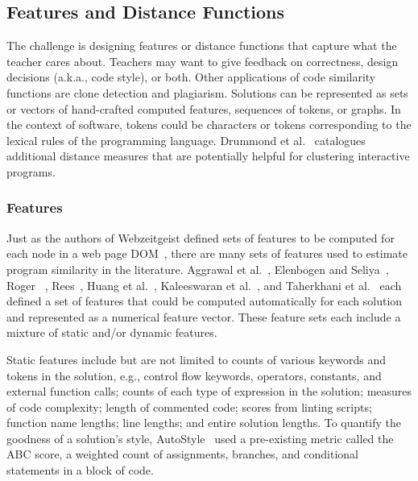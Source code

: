 
\subsection{Features and Distance Functions}

The challenge is designing features or distance functions that capture what the teacher cares about. Teachers may want to give feedback on correctness, design decisions (a.k.a., code style), or both. Other applications of code similarity functions are clone detection and plagiarism. Solutions can be represented as sets or vectors of hand-crafted computed features, sequences of tokens, or graphs. In the context of software, tokens could be characters or tokens corresponding to the lexical rules of the programming language. Drummond et al.~\cite{drummond2014learning} catalogues additional distance measures that are potentially helpful for clustering interactive programs.

\subsubsection{Features}
Just as the authors of Webzeitgeist defined sets of features to be computed for each node in a web page DOM~\cite{webzeitgeist}, there are many sets of features used to estimate program similarity in the literature. Aggrawal et al.~\cite{srikant2014system}, Elenbogen and Seliya~\cite{Elenbogen}, Roger ~\cite{ACESthesis}, Rees~\cite{Rees:1982}, Huang et al.~\cite{MOOCshop}, Kaleeswaran et al.~\cite{kaleeswaran2016semi}, and Taherkhani et al.~\cite{taherkhani2010recognizing} each defined a set of features that could be computed automatically for each solution and represented as a numerical feature vector. These feature sets each include a mixture of static and/or dynamic features.

Static features include but are not limited to counts of various keywords and tokens in the solution, e.g., control flow keywords, operators, constants, and external function calls; counts of each type of expression in the solution;  measures of code complexity; length of commented code; scores from linting scripts; function name lengths; line lengths; and entire solution lengths. To quantify the goodness of a solution's style, AutoStyle~\cite{choudhury2016autostyle} used a pre-existing metric called the ABC score, a weighted count of assignments, branches, and conditional statements in a block of code.

